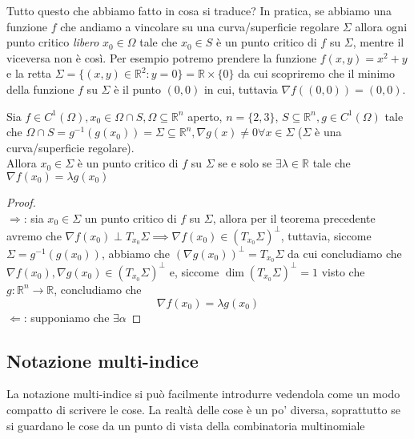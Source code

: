 \documentclass[openany, italian]{book}
\begin{document}
\begin{remark}
Tutto questo che abbiamo fatto in cosa si traduce? In pratica, se abbiamo una funzione $f$ che andiamo a vincolare su una curva/superficie regolare $\Sigma$ allora ogni punto critico \emph{libero} $x_0 \in \Omega$ tale che $x_0 \in S$ è un punto critico di $f$ su $\Sigma$, mentre il viceversa non è così. Per esempio potremo prendere la funzione $f(x, y) = x^2 + y$ e la retta $\Sigma = \{(x, y) \in \mathbb{R}^2 : y=0 \} = \mathbb{R} \times \{ 0 \}$ da cui scopriremo che il minimo della funzione $f$ su $\Sigma$ è il punto $(0, 0)$ in cui, tuttavia $\nabla f((0, 0)) = (0, 0)$. 
\end{remark}
\begin{theorem}
Sia $f \in C^{1} (\Omega), x_0 \in \Omega \cap S, \Omega \subseteq \mathbb{R}^n$ aperto, $n= \{ 2, 3 \}$, $S \subseteq \mathbb{R}^n, g \in C^1 (\Omega)$ tale che $\Omega \cap S = g^{-1}(g(x_0)) = \Sigma \subseteq \mathbb{R}^n, \nabla g(x) \neq 0 \forall x \in \Sigma$ ($\Sigma$ è una curva/superficie regolare). \\
Allora $x_0 \in \Sigma$ è un punto critico di $f$ su $\Sigma$ se e solo se $\exists \lambda \in \mathbb{R}$ tale che $\nabla f(x_0) = \lambda g(x_0)$
\end{theorem}
\begin{proof} \hspace{1cm} \\
$\boxed{\Rightarrow}$: sia $x_0 \in \Sigma$ un punto critico di $f$ su $\Sigma$, allora per il teorema precedente avremo che $\nabla f(x_0) \perp T_{x_0} \Sigma \implies \nabla f(x_0) \in (T_{x_0} \Sigma)^{\perp}$, tuttavia, siccome $\Sigma = g^{-1}(g(x_0))$, abbiamo che $(\nabla g(x_0))^{\perp} = T_{x_0} \Sigma$ da cui concludiamo che $\nabla f(x_0), \nabla g(x_0) \in (T_{x_0} \Sigma)^{\perp}$ e, siccome $\dim{(T_{x_0} \Sigma)^{\perp}} = 1$ visto che $g: \mathbb{R}^n \to \mathbb{R}$, concludiamo che 
$$
\nabla f(x_0) = \lambda g(x_0)
$$
$\boxed{\Leftarrow}$: supponiamo che $\exists \alpha$
\end{proof}











\begin{appendices}
\chapter{Notazione multi-indice}
La notazione multi-indice si può facilmente introdurre vedendola come un modo compatto di scrivere le cose. La realtà delle cose è un po' diversa, soprattutto se si guardano le cose da un punto di vista della combinatoria multinomiale
\end{appendices}
\end{document}
